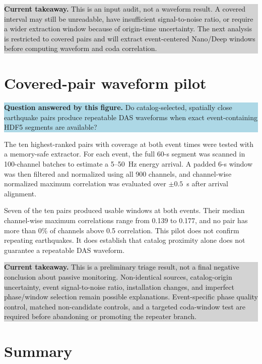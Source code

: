 \documentclass[11pt]{article}
\newcommand{\figquestion}[1]{\par\medskip\noindent\colorbox{lightblue}{\parbox{0.95\linewidth}{\textcolor{questionblue}{\textbf{Question answered by this figure.}} #1}}\par\medskip}
\newcommand{\takeaway}[1]{\par\smallskip\noindent\colorbox{lightgray}{\parbox{0.95\linewidth}{\textbf{Current takeaway.} #1}}\par\medskip}
\begin{document}
\takeaway{This is an input audit, not a waveform result.  A covered interval
may still be unreadable, have insufficient signal-to-noise ratio, or require a
wider extraction window because of origin-time uncertainty.  The next analysis
is restricted to covered pairs and will extract event-centered Nano/Deep windows
before computing waveform and coda correlation.}

\section{Covered-pair waveform pilot}

\figquestion{Do catalog-selected, spatially close earthquake pairs produce
repeatable DAS waveforms when exact event-containing HDF5 segments are
available?}

The ten highest-ranked pairs with coverage at both event times were tested with
a memory-safe extractor.  For each event, the full 60-s segment was scanned in
100-channel batches to estimate a 5--50~Hz energy arrival.  A padded 6-s window
was then filtered and normalized using all 900 channels, and channel-wise
normalized maximum correlation was evaluated over $\pm0.5$~s after arrival
alignment.

Seven of the ten pairs produced usable windows at both events.  Their median
channel-wise maximum correlations range from 0.139 to 0.177, and no pair has
more than 0\% of channels above 0.5 correlation.  This pilot does not confirm
repeating earthquakes.  It does establish that catalog proximity alone does not
guarantee a repeatable DAS waveform.

\takeaway{This is a preliminary triage result, not a final negative conclusion
about passive monitoring.  Non-identical sources, catalog-origin uncertainty,
event signal-to-noise ratio, installation changes, and imperfect phase/window
selection remain possible explanations.  Event-specific phase quality control,
matched non-candidate controls, and a targeted coda-window test are required
before abandoning or promoting the repeater branch.}

\section{Summary}
\end{document}
